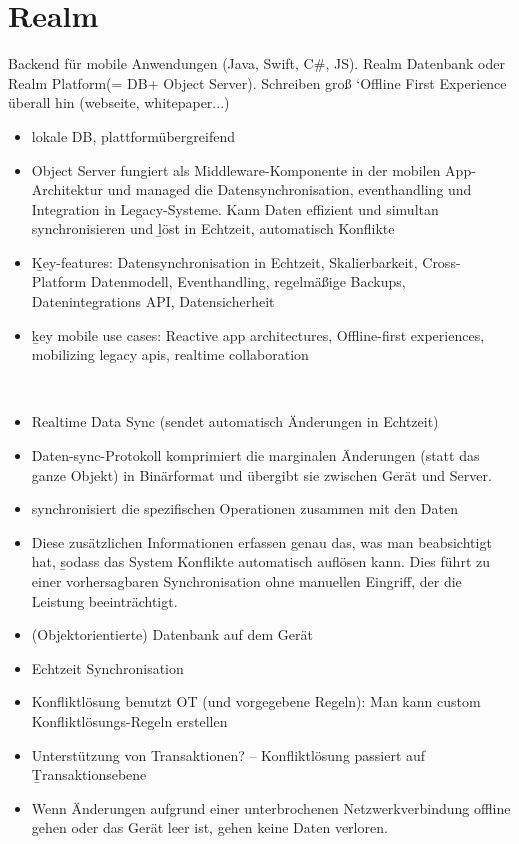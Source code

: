 \section{\label{sub:realm}Realm}
Backend für mobile Anwendungen (Java, Swift, C\#, JS). Realm Datenbank oder Realm Platform(= DB+ Object Server).
Schreiben groß `Offline First Experience überall hin (webseite, whitepaper...)
\begin{itemize}
  \item lokale DB, plattformübergreifend
  \item Object Server fungiert als Middleware-Komponente in der mobilen \gls{App}-Architektur und managed die Datensynchronisation, eventhandling und Integration in Legacy-Systeme. Kann Daten effizient und simultan synchronisieren und \b{löst in Echtzeit, automatisch Konflikte}
  \item \b{Key-features:} Datensynchronisation in Echtzeit, Skalierbarkeit, Cross-Platform Datenmodell, Eventhandling, regelmäßige Backups, Datenintegrations API, Datensicherheit
  \item \b{key mobile use cases:} Reactive app architectures, Offline-first experiences, mobilizing legacy apis, realtime collaboration
\end{itemize}~\cite{realm_whitepaper}

\begin{itemize}
  \item Realtime Data Sync (sendet automatisch Änderungen in Echtzeit)
  \item Daten-sync-Protokoll komprimiert die marginalen Änderungen (statt das ganze Objekt) in Binärformat und übergibt sie zwischen Gerät und Server.
  \item synchronisiert die spezifischen Operationen zusammen mit den Daten
  \item Diese zusätzlichen Informationen erfassen genau das, was man beabsichtigt hat, \b{sodass das System Konflikte automatisch auflösen kann}. Dies führt zu einer vorhersagbaren Synchronisation ohne manuellen Eingriff, der die Leistung beeinträchtigt.
  \item (Objektorientierte) Datenbank auf dem Gerät
  \item Echtzeit Synchronisation
  \item Konfliktlösung benutzt OT (und vorgegebene Regeln): Man kann custom Konfliktlösungs-Regeln erstellen
  \item Unterstützung von Transaktionen? -- Konfliktlösung passiert auf \b{Transaktionsebene}
  \item Wenn Änderungen aufgrund einer unterbrochenen Netzwerkverbindung offline gehen oder das Gerät leer ist, gehen keine Daten verloren.
\end{itemize}~\cite{realm_offline_whitepaper}
